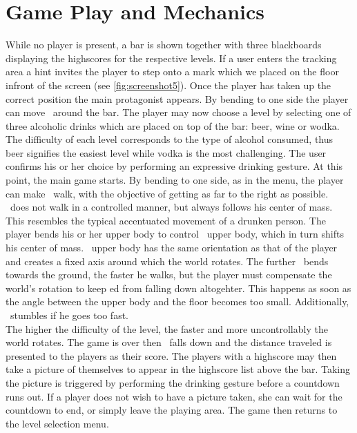 \documentclass{chi-ext}
\begin{document}
\section{Game Play and Mechanics}
While no player is present, a bar is shown together with three blackboards displaying the highscores for the respective levels. If a user enters the tracking area a hint invites the player to step onto a mark which we placed on the floor infront of the screen (see \autoref{fig:screenshot5}). Once the player has taken up the correct position the main protagonist \ed appears. By bending to one side the player can move \ed\ around the bar. The player may now choose a level by selecting one of three alcoholic drinks which are placed on top of the bar: beer, wine or wodka. The difficulty of each level corresponds to the type of alcohol consumed, thus beer signifies the easiest level while vodka is the most challenging. The user confirms his or her choice by performing an expressive drinking gesture.
At this point, the main game starts. By bending to one side, as in the menu, the player can make \ed\ walk, with the objective of getting as far to the right as possible. \ed\ does not walk in a controlled manner, but always follows his center of mass. This resembles the typical accentuated movement of a drunken person. The player bends his or her upper body to control \eds\ upper body, which in turn shifts his center of mass. \eds\ upper body has the same orientation as that of the player and creates a fixed axis around which the world rotates. The further \ed\ bends towards the ground, the faster he walks, but the player must compensate the world's rotation to keep ed from falling down altogehter. This happens as soon as the angle between the upper body and the floor becomes too small. Additionally, \ed\ stumbles if he goes too fast.\\
The higher the difficulty of the level, the faster and more uncontrollably the world rotates.\lbreak
The game is over then \ed\ falls down and the distance traveled is presented to the players as their score. The players with a highscore may then take a picture of themselves to appear in the highscore list above the bar. Taking the picture is triggered by performing the drinking gesture before a countdown runs out. If a player does not wish to have a picture taken, she can wait for the countdown to end, or simply leave the playing area. The game then returns to the level selection menu.\lbreak
\end{document}
